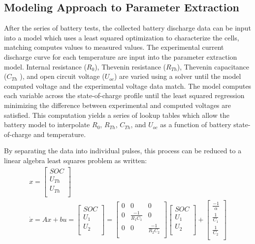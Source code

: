 \documentclass[]{aiaa-tc}%
\begin{document}
\subsection{Modeling Approach to Parameter Extraction}

After the series of battery tests, the collected battery discharge data can be input into a model which uses a least squared optimization to characterize the cells, matching computes values to measured values. The experimental current discharge curve for each temperature are input into the parameter extraction model. Internal resistance ($R_{0}$), Thevenin resistance ($R_{Th}$), Thevenin capacitance ($C_{Th}$ ), and open circuit voltage ($U_{oc}$) are varied using a solver until the model computed voltage and the experimental voltage data match. The model computes each variable across the state-of-charge profile until the least squared regression minimizing the difference between experimental and computed voltages are satisfied. This computation yields a series of lookup tables which allow the battery model to interpolate $R_{0}$, $R_{Th}$, $C_{Th}$, and $U_{oc}$ as a function of battery state-of-charge and temperature. 

By separating the data into individual pulses, this process can be reduced to a linear algebra least squares problem as written:
\begin{equation}
    \begin{aligned}
        x = 
        \begin{bmatrix}
            SOC \\
            U_{Th} \\
            U_{Th} \\
        \end{bmatrix}
        \\
        \dot{x} = Ax+bu = 
        \begin{bmatrix}
            SOC \\
            U_{1} \\
            U_{2} \\
        \end{bmatrix}
        =
        \begin{bmatrix}
            0 & 0 & 0 \\
            0 & \frac{-1}{R_{1}C_{1}} & 0 \\
           0 & 0 & \frac{-1}{R_{2}C_{2}} \\
        \end{bmatrix}
        \begin{bmatrix}
            SOC \\
            U_{1} \\
            U_{2} \\
        \end{bmatrix}
        +
        \begin{bmatrix}
            \frac{-1}{\alpha} \\
            \frac{1}{C_{1}} \\
            \frac{1}{C_{2}} \\
        \end{bmatrix}
    \end{aligned}
\end{equation}    
\end{document}
